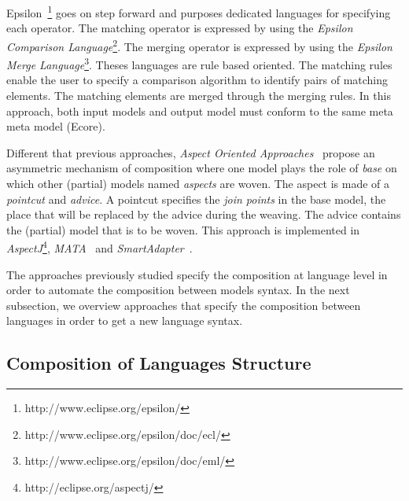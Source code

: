 Epsilon~\cite{epsilon}\footnote{http://www.eclipse.org/epsilon/} goes on step forward and purposes dedicated languages for specifying each operator. The matching operator is expressed by using the \emph{Epsilon Comparison Language}\footnote{http://www.eclipse.org/epsilon/doc/ecl/}. The merging operator is expressed by using the \emph{Epsilon Merge Language}\footnote{http://www.eclipse.org/epsilon/doc/eml/}. Theses languages are rule based oriented. The matching rules enable the user to specify a comparison algorithm to identify pairs of matching elements. The matching elements are merged through the merging rules. In this approach, both input models and output model must conform to the same meta meta model (Ecore).
    		
Different that previous approaches, \emph{Aspect Oriented Approaches}~\cite{aop} propose an asymmetric mechanism of composition where one model plays the role of \emph{base} on which other (partial) models named \emph{aspects} are woven. The aspect is made of a \emph{pointcut} and \emph{advice}. A pointcut specifies the \emph{join points} in the base model, \ie the place that will be replaced by the advice during the weaving. The advice contains the (partial) model that is to be woven. This approach is implemented in \emph{AspectJ}\footnote{http://eclipse.org/aspectj/}, \emph{MATA}~\cite{matabib} and \emph{SmartAdapter}~\cite{smartadapbib}. %

The approaches previously studied specify the composition at language level in order to automate the composition between models syntax. In the next subsection, we overview approaches that specify the composition between languages in order to get a new language syntax. 	 		
    	
\subsection{Composition of Languages Structure}

